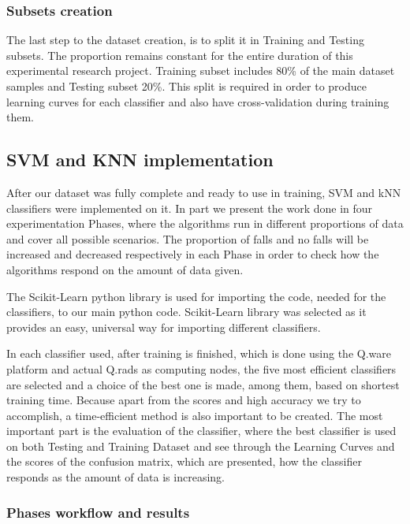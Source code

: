 \documentclass[10pt, conference, compsocconf]{IEEEtran}
\begin{document}
\subsubsection{Subsets creation}

The last step to the dataset creation, is to split it in Training and Testing subsets. The proportion remains constant for the entire duration of this experimental research project. Training subset includes 80\% of the main dataset samples and Testing subset 20\%. This split is required in order to produce learning curves for each classifier and also have cross-validation during training them.

\subsection{SVM and KNN implementation}

After our dataset was fully complete and ready to use in training, SVM and kNN classifiers were implemented on it. In part we present the work done in four experimentation Phases, where the algorithms run in different proportions of data and cover all possible scenarios. The proportion of falls and no falls will be increased and decreased respectively in each Phase in order to check how the algorithms respond on the amount of data given.

The Scikit-Learn python library is used for importing the code, needed for the classifiers, to our main python code. Scikit-Learn library was selected as it provides an easy, universal way for importing different classifiers. 

In each classifier used, after training is finished, which is done using the Q.ware platform and actual Q.rads as computing nodes, the five most efficient classifiers are selected and a choice of the best one is made, among them, based on shortest training time. Because apart from the scores and high accuracy we try to accomplish, a time-efficient method is also important to be created. The most important part is the evaluation of the classifier, where the best classifier is used on both Testing and Training Dataset and see through the Learning Curves and the scores of the confusion matrix, which are presented, how the classifier responds as the amount of data is increasing. 

\subsubsection{Phases workflow and results}
\end{document}
